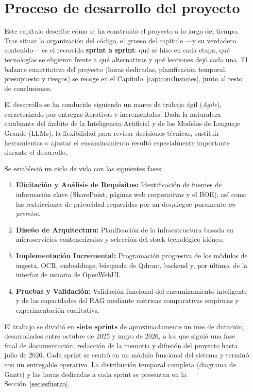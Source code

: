 \chapter{Proceso de desarrollo del proyecto}
\label{cap:metodologia}

Este capítulo describe cómo se ha construido el proyecto a lo largo del tiempo. Tras situar la organización del código, el grueso del capítulo ---y su verdadero contenido--- es el recorrido \textbf{sprint a sprint}: qué se hizo en cada etapa, qué tecnologías se eligieron frente a qué alternativas y qué lecciones dejó cada una. El balance cuantitativo del proyecto (horas dedicadas, planificación temporal, presupuesto y riesgos) se recoge en el Capítulo~\ref{cap:conclusiones}, junto al resto de conclusiones.

El desarrollo se ha conducido siguiendo un marco de trabajo ágil (\textit{Agile}), caracterizado por entregas iterativas e incrementales. Dada la naturaleza cambiante del ámbito de la Inteligencia Artificial y de los Modelos de Lenguaje Grande (LLMs), la flexibilidad para revisar decisiones técnicas, sustituir herramientas o ajustar el encaminamiento resultó especialmente importante durante el desarrollo.

Se estableció un ciclo de vida con las siguientes fases:
\begin{enumerate}
    \item \textbf{Elicitación y Análisis de Requisitos:} Identificación de fuentes de información clave (SharePoint, páginas web corporativas y el BOE), así como las restricciones de privacidad requeridas por un despliegue puramente \textit{on-premise}.
    \item \textbf{Diseño de Arquitectura:} Planificación de la infraestructura basada en microservicios contenerizados y selección del stack tecnológico idóneo.
    \item \textbf{Implementación Incremental:} Programación progresiva de los módulos de ingesta, OCR, embeddings, búsqueda de Qdrant, backend y, por último, de la interfaz de usuario de OpenWebUI.
    \item \textbf{Pruebas y Validación:} Validación funcional del encaminamiento inteligente y de las capacidades del RAG mediante métricas comparativas empíricas y experimentación cualitativa.
\end{enumerate}

El trabajo se dividió en \textbf{siete sprints} de aproximadamente un mes de duración, desarrollados entre octubre de 2025 y mayo de 2026, a los que siguió una fase final de documentación, redacción de la memoria y difusión del proyecto hasta julio de 2026. Cada sprint se centró en un módulo funcional del sistema y terminó con un entregable operativo. La distribución temporal completa (diagrama de Gantt) y las horas dedicadas a cada sprint se presentan en la Sección~\ref{sec:esfuerzo}.

